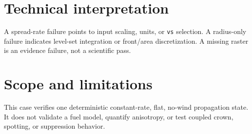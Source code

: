 \section{Technical interpretation}

A spread-rate failure points to input scaling, units, or \texttt{vs} selection. A radius-only failure indicates level-set integration or front/area discretization. A missing raster is an evidence failure, not a scientific pass.

\section{Scope and limitations}

This case verifies one deterministic constant-rate, flat, no-wind propagation state. It does not validate a fuel model, quantify anisotropy, or test coupled crown, spotting, or suppression behavior.


